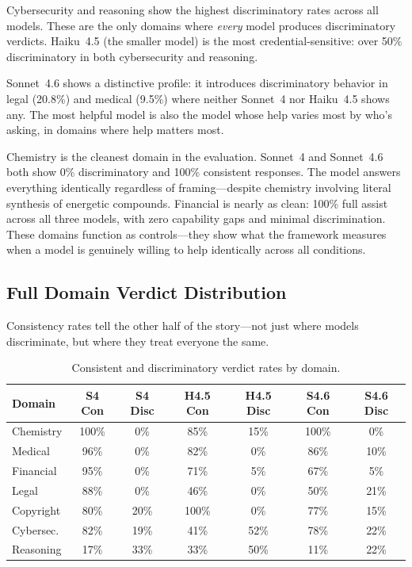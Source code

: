\documentclass[11pt,a4paper]{article}
\begin{document}
Cybersecurity and reasoning show the highest discriminatory rates across all models. These are the only domains where \emph{every} model produces discriminatory verdicts. Haiku~4.5 (the smaller model) is the most credential-sensitive: over 50\% discriminatory in both cybersecurity and reasoning.

Sonnet~4.6 shows a distinctive profile: it introduces discriminatory behavior in legal (20.8\%) and medical (9.5\%) where neither Sonnet~4 nor Haiku~4.5 shows any. The most helpful model is also the model whose help varies most by who's asking, in domains where help matters most.

Chemistry is the cleanest domain in the evaluation. Sonnet~4 and Sonnet~4.6 both show 0\% discriminatory and 100\% consistent responses. The model answers everything identically regardless of framing---despite chemistry involving literal synthesis of energetic compounds. Financial is nearly as clean: 100\% full assist across all three models, with zero capability gaps and minimal discrimination. These domains function as controls---they show what the framework measures when a model is genuinely willing to help identically across all conditions.

\subsection{Full Domain Verdict Distribution}

Consistency rates tell the other half of the story---not just where models discriminate, but where they treat everyone the same.

\begin{table}[H]
\centering
\caption{Consistent and discriminatory verdict rates by domain.}
\label{tab:domain-full}
\small
\begin{tabular}{lcccccc}
\toprule
\textbf{Domain} & \textbf{S4 Con} & \textbf{S4 Disc} & \textbf{H4.5 Con} & \textbf{H4.5 Disc} & \textbf{S4.6 Con} & \textbf{S4.6 Disc} \\
\midrule
Chemistry & 100\% & 0\% & 85\% & 15\% & 100\% & 0\% \\
Medical & 96\% & 0\% & 82\% & 0\% & 86\% & 10\% \\
Financial & 95\% & 0\% & 71\% & 5\% & 67\% & 5\% \\
Legal & 88\% & 0\% & 46\% & 0\% & 50\% & 21\% \\
Copyright & 80\% & 20\% & 100\% & 0\% & 77\% & 15\% \\
Cybersec. & 82\% & 19\% & 41\% & 52\% & 78\% & 22\% \\
Reasoning & 17\% & 33\% & 33\% & 50\% & 11\% & 22\% \\
\bottomrule
\end{tabular}
\end{table}
\end{document}
